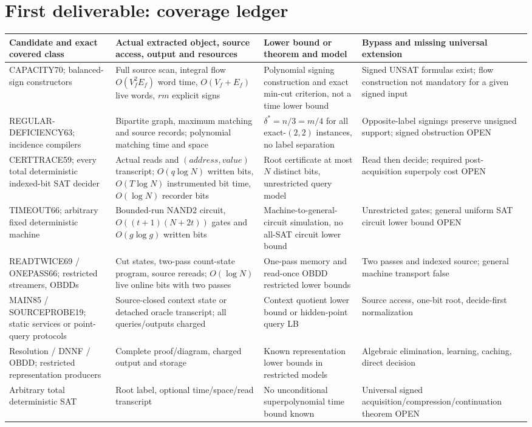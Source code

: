 \documentclass[11pt]{article}
\begin{document}
\section{First deliverable: coverage ledger}
\small
\begin{longtable}{@{}p{.16\linewidth}p{.23\linewidth}p{.27\linewidth}p{.25\linewidth}@{}}
\toprule Candidate and exact covered class & Actual extracted object, source access, output and resources & Lower bound or theorem and model & Bypass and missing universal extension\\\midrule\endhead
CAPACITY70; balanced-sign constructors & Full source scan, integral flow $O(V_f^2E_f)$ word time, $O(V_f+E_f)$ live words, $rm$ explicit signs & Polynomial signing construction and exact min-cut criterion, not a time lower bound & Signed UNSAT formulas exist; flow construction not mandatory for a given signed input\\
REGULAR-DEFICIENCY63; incidence compilers & Bipartite graph, maximum matching and source records; polynomial matching time and space & $\delta^*=n/3=m/4$ for all exact-$(2,2)$ instances, no label separation & Opposite-label signings preserve unsigned support; signed obstruction OPEN\\
CERTTRACE59; every total deterministic indexed-bit SAT decider & Actual reads and $(address,value)$ transcript; $O(q\log N)$ written bits, $O(T\log N)$ instrumented bit time, $O(\log N)$ recorder bits & Root certificate at most $N$ distinct bits, unrestricted query model & Read then decide; required post-acquisition superpoly cost OPEN\\
TIMEOUT66; arbitrary fixed deterministic machine & Bounded-run NAND2 circuit, $O((t+1)(N+2t))$ gates and $O(g\log g)$ written bits & Machine-to-general-circuit simulation, no all-SAT circuit lower bound & Unrestricted gates; general uniform SAT circuit lower bound OPEN\\
READTWICE69 / ONEPASS66; restricted streamers, OBDDs & Cut states, two-pass count-state program, source rereads; $O(\log N)$ live online bits with two passes & One-pass memory and read-once OBDD restricted lower bounds & Two passes and indexed source; general machine transport false\\
MAIN85 / SOURCEPROBE19; static services or point-query protocols & Source-closed context state or detached oracle transcript; all queries/outputs charged & Context quotient lower bound or hidden-point query LB & Source access, one-bit root, decide-first normalization\\
Resolution / DNNF / OBDD; restricted representation producers & Complete proof/diagram, charged output and storage & Known representation lower bounds in restricted models & Algebraic elimination, learning, caching, direct decision\\
Arbitrary total deterministic SAT & Root label, optional time/space/read transcript & No unconditional superpolynomial time bound known & Universal signed acquisition/compression/continuation theorem OPEN\\
\bottomrule
\end{longtable}
\normalsize
\end{document}
